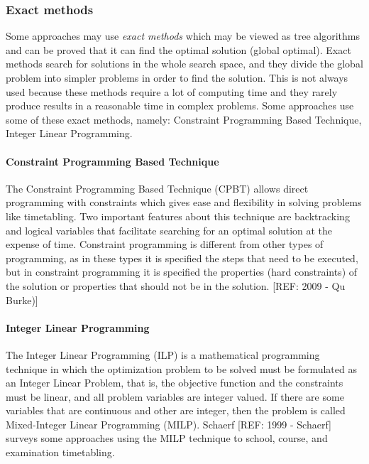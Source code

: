 \subsubsection{Exact methods}
\label{subsection:exactmethods}
Some approaches may use \textit{exact methods} which may be viewed as tree algorithms and can be proved that it can find the optimal solution (global optimal). Exact methods search for solutions in the whole search space, and they divide the global problem into simpler problems in order to find the solution. This is not always used because these methods require a lot of computing time and they rarely produce results in a reasonable time in complex problems. Some approaches use some of these exact methods, namely: Constraint Programming Based Technique, Integer Linear Programming.\\

\paragraph{Constraint Programming Based Technique}
The Constraint Programming Based Technique (CPBT) allows direct programming with constraints which gives ease and flexibility in solving problems like timetabling. Two important features about this technique are backtracking and logical variables that facilitate searching for an optimal solution at the expense of time. Constraint programming is different from other types of programming, as in these types it is specified the steps that need to be executed, but in constraint programming it is specified the properties (hard constraints) of the solution or properties that should not be in the solution. [REF: 2009 - Qu Burke)]\\

\paragraph{Integer Linear Programming}
The Integer Linear Programming (ILP) is a mathematical programming technique in which the optimization problem to be solved must be formulated as an Integer Linear Problem, that is, the objective function and the constraints must be linear, and all problem variables are integer valued. If there are some variables that are continuous and other are integer, then the problem is called Mixed-Integer Linear Programming (MILP). Schaerf [REF: 1999 - Schaerf] surveys some approaches using the MILP technique to school, course, and examination timetabling.

